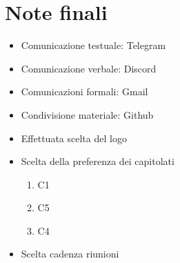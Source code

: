 \documentclass[12pt]{article}
\begin{document}
\section{Note finali}
\begin{itemize}
    \item Comunicazione testuale: Telegram
    \item Comunicazione verbale: Discord
    \item Comunicazioni formali: Gmail
    \item Condivisione materiale: Github
    \item Effettuata scelta del logo
    \item Scelta della preferenza dei capitolati    \begin{enumerate}
                                                        \item C1
                                                        \item C5
                                                        \item C4
                                                    \end{enumerate}
    \item Scelta cadenza riunioni
\end{itemize}
\end{document}
